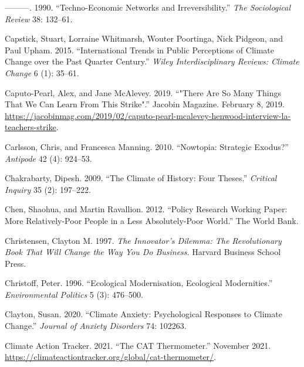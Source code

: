 \documentclass[a4paper, nobind]{templates/ociamthesis}
\newlength{\cslhangindent}
\newenvironment{CSLReferences}[2] %
 {%
  \setlength{\parindent}{0pt}
  \ifodd #1
  \let\oldpar\par
  \def\par{\hangindent=\cslhangindent\oldpar}
  \fi
  \setlength{\parskip}{1mm}
  \setlength{\baselineskip}{6mm}
 }%
 {}
\begin{document}
\begin{CSLReferences}{1}{0}
\leavevmode{}%
---------. 1990. {``Techno-Economic Networks and Irreversibility.''} \emph{The Sociological Review} 38: 132--61.

\leavevmode{}%
Capstick, Stuart, Lorraine Whitmarsh, Wouter Poortinga, Nick Pidgeon, and Paul Upham. 2015. {``International Trends in Public Perceptions of Climate Change over the Past Quarter Century.''} \emph{Wiley Interdisciplinary Reviews: Climate Change} 6 (1): 35--61.

\leavevmode{}%
Caputo-Pearl, Alex, and Jane McAlevey. 2019. {``"{There Are So Many Things That We Can Learn From This Strike}".''} {Jacobin Magazine}. February 8, 2019. \url{https://jacobinmag.com/2019/02/caputo-pearl-mcalevey-henwood-interview-la-teachers-strike}.

\leavevmode{}%
Carlsson, Chris, and Francesca Manning. 2010. {``Nowtopia: {Strategic Exodus}?''} \emph{Antipode} 42 (4): 924--53.

\leavevmode{}%
Chakrabarty, Dipesh. 2009. {``The Climate of History: {Four} Theses.''} \emph{Critical Inquiry} 35 (2): 197--222.

\leavevmode{}%
Chen, Shaohua, and Martin Ravallion. 2012. {``Policy {Research Working Paper}: {More} Relatively-Poor People in a Less Absolutely-Poor World.''} {The World Bank}.

\leavevmode{}%
Christensen, Clayton M. 1997. \emph{The {Innovator}'s {Dilemma}: {The Revolutionary Book That Will Change} the {Way You Do Business}}. {Harvard Business School Press}.

\leavevmode{}%
Christoff, Peter. 1996. {``Ecological Modernisation, Ecological Modernities.''} \emph{Environmental Politics} 5 (3): 476--500.

\leavevmode{}%
Clayton, Susan. 2020. {``Climate Anxiety: {Psychological} Responses to Climate Change.''} \emph{Journal of Anxiety Disorders} 74: 102263.

\leavevmode{}%
Climate Action Tracker. 2021. {``The {CAT Thermometer}.''} November 2021. \url{https://climateactiontracker.org/global/cat-thermometer/}.


\end{CSLReferences}
\end{document}
